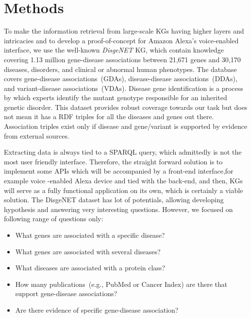 \documentclass[10pt,journal,compsoc]{IEEEtran}
\begin{document}
\section{Methods} \label{sec:method}
To make the information retrieval from large-scale KGs having higher layers and intricacies and to develop a proof-of-concept for Amazon Alexa's voice-enabled interface, we use the well-known \emph{DisgeNET} KG, which contain knowledge covering 1.13 million gene-disease associations between 21,671 genes and 30,170 diseases, disorders, and clinical or abnormal human phenotypes. %
The database covers gene-disease associations~(GDAs), disease-disease associations~(DDAs), and variant-disease associations~(VDAs). 
Disease gene identification is a process by which experts identify the mutant genotype responsible for an inherited genetic disorder. This dataset provides robust coverage towards our task but does not mean it has a RDF triples for all the diseases and genes out there. Association triples exist only if disease and gene/variant is supported by evidence from external sources. 

Extracting data is always tied to a SPARQL query, which admittedly is not the most user friendly interface. Therefore, the straight forward solution is to implement some APIs which will be accompanied by a front-end interface,for example voice -enabled Alexa device and tied with the back-end, and then, KGs will serve as a fully functional application on its own, which is certainly a viable solution. The DisgeNET dataset has lot of potentials, allowing developing hypothesis and answering very interesting questions. However, we focused on following range of questions only:

\begin{itemize}
  \item What genes are associated with a specific disease?
  \item What genes are associated with several diseases?
  \item What diseases are associated with a protein class?
  \item How many publications~(e.g., PubMed or Cancer Index) are there that support gene-disease associations?
  \item Are there evidence of specific gene-disease association?
\end{itemize}
\end{document}
